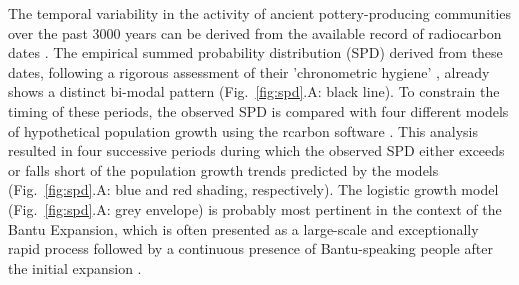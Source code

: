 \documentclass[smallextended,natbib]{svjour3}       %
\begin{document}
The temporal variability in the activity of ancient pottery-producing communities over the past 3000 years can be derived from the available record of radiocarbon dates \citep{Seidensticker.2021f}. The empirical summed probability distribution (SPD) derived from these dates, following a rigorous assessment of their 'chronometric hygiene' \citep{Napolitano.2019}, already shows a distinct bi-modal pattern (Fig.~\ref{fig:spd}.A: black line). To constrain the timing of these periods, the observed SPD is compared with four different models of hypothetical population growth using the rcarbon software \citep{Bevan.2022}. This analysis resulted in four successive periods during which the observed SPD either exceeds or falls short of the population growth trends predicted by the models (Fig.~\ref{fig:spd}.A: blue and red shading, respectively). The logistic growth model (Fig.~\ref{fig:spd}.A: grey envelope) is probably most pertinent in the context of the Bantu Expansion, which is often presented as a large-scale and exceptionally rapid process followed by a continuous presence of Bantu-speaking people after the initial expansion \citep{Pakendorf.2011,Grollemund.2015,Bostoen.2015,Bostoen.2022,Koile.2022}.
\end{document}
